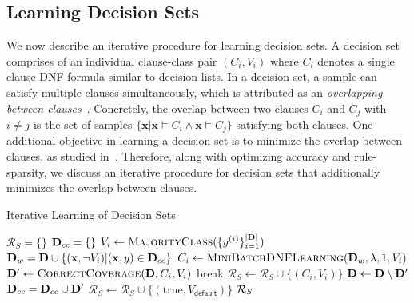 \subsection{Learning Decision Sets}
We now describe an iterative procedure for learning decision sets. A decision set comprises of an individual clause-class  pair $ (C_i, V_i) $ where $ C_i $ denotes a single clause DNF formula similar to decision lists. In a decision set, a sample can satisfy multiple clauses simultaneously, which is attributed as an \textit{overlapping between clauses}~\cite{lakkaraju2016interpretable}. Concretely, the overlap between two clauses $ C_i $ and $ C_j $ with $ i \ne j $ is the set of samples $ \{\mathbf{x} | \mathbf{x} \models C_i \wedge \mathbf{x} \models C_j\} $ satisfying both clauses. One additional objective in learning a decision set is to minimize the overlap between clauses, as studied in~\cite{lakkaraju2016interpretable}. 
Therefore, along with optimizing accuracy and rule-sparsity, we discuss an iterative procedure for decision sets that additionally minimizes the overlap between clauses.

\begin{algorithm}
	\caption{Iterative Learning of Decision Sets}
	\label{interpretability_imli_algo:iterative_decision_sets_learning}
	\begin{algorithmic}[1]
		\State $ \mathcal{R}_S=\{\} $
		\State $ \mathbf{D}_{cc} = \{\}$  
		\State $ V_i \leftarrow \textsc{MajorityClass}(\{y^{(i)}\}_{i=1}^{|\mathbf{D}|}) $
		\State $ \mathbf{D}_{w} = \mathbf{D}  \cup \{(\mathbf{x}, \neg V_i) | (\mathbf{x}, y) \in \mathbf{D}_{cc}\} $ 
		\State $ C_i \leftarrow \textsc{MiniBatchDNFLearning}( \mathbf{D}_w,\lambda, 1, V_i) $ 
		\State $ \mathbf{D}' \leftarrow \textsc{CorrectCoverage}(\mathbf{D}, C_i, V_i) $
		\State break
		\EndIf
		\State $ \mathcal{R}_S \leftarrow \mathcal{R}_S \cup \{(C_i, V_i)\} $
		\State $ \mathbf{D} \leftarrow \mathbf{D}  \setminus \mathbf{D}' $
		\State $ \mathbf{D}_{cc} = \mathbf{D}_{cc} \cup \mathbf{D}' $
		\EndFor
		\State $ \mathcal{R}_S \leftarrow \mathcal{R}_S  \cup \{(\text{true}, V_{\mathsf{default}} )\}$
		\State \Return $ {\mathcal{R}}_S $
		\EndProcedure
	\end{algorithmic}
\end{algorithm} 






